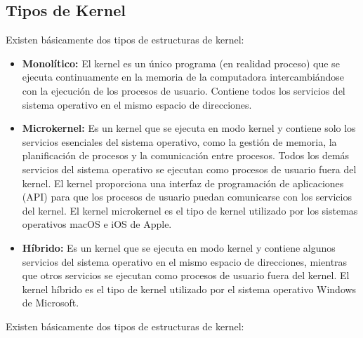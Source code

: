 \documentclass[../main.tex]{subfiles}
\begin{document}
    \subsection{Tipos de Kernel}
        Existen básicamente dos tipos de estructuras de kernel:
        \begin{itemize}
            \item \textbf{Monolítico:} El kernel es un único programa (en realidad proceso) que se ejecuta continuamente en la memoria de la computadora intercambiándose con la ejecución de los procesos de usuario. Contiene todos los servicios del sistema operativo en el mismo espacio de direcciones.
            \item \textbf{Microkernel:} Es un kernel que se ejecuta en modo kernel y contiene solo los servicios esenciales del sistema operativo, como la gestión de memoria, la planificación de procesos y la comunicación entre procesos. Todos los demás servicios del sistema operativo se ejecutan como procesos de usuario fuera del kernel. El kernel proporciona una interfaz de programación de aplicaciones (API) para que los procesos de usuario puedan comunicarse con los servicios del kernel. El kernel microkernel es el tipo de kernel utilizado por los sistemas operativos macOS e iOS de Apple.
            \item \textbf{Híbrido:} Es un kernel que se ejecuta en modo kernel y contiene algunos servicios del sistema operativo en el mismo espacio de direcciones, mientras que otros servicios se ejecutan como procesos de usuario fuera del kernel. El kernel híbrido es el tipo de kernel utilizado por el sistema operativo Windows de Microsoft.
        \end{itemize}Existen básicamente dos tipos de estructuras de kernel:   
        
        
\end{document}
